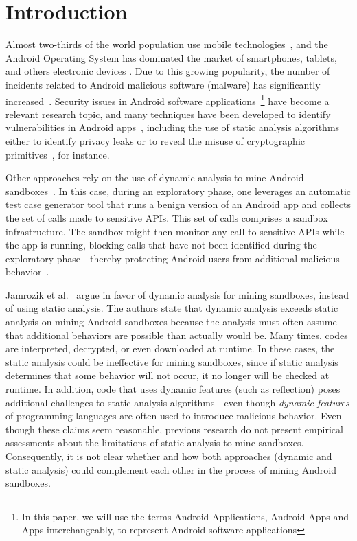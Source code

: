 \section{Introduction}\label{sec:introduction}

Almost two-thirds of the world population use mobile technologies~\cite{Comscore}, and the Android Operating System has dominated the market of smartphones, tablets, and others electronic devices \cite{statcounter}. Due to this growing popularity, the number of incidents related to Android malicious software (malware) has significantly increased~\cite{DBLP:journals/comsur/FarukiBLGGCR15,DBLP:journals/csur/SufatrioTCT15}. Security issues in Android software applications~\footnote{In this paper, we will use the terms Android Applications, Android Apps and Apps interchangeably, to represent Android software applications} have become a relevant research topic, and many techniques have been developed to identify vulnerabilities in Android apps~\cite{DBLP:conf/pldi/ArztRFBBKTOM14}, including the use of static analysis algorithms either to identify privacy leaks or to reveal the misuse of cryptographic primitives~\cite{krueger:ecoop-2018,rahaman:ccs-2019}, for instance.

Other approaches rely on the use of dynamic analysis to mine Android sandboxes~\cite{DBLP:conf/icse/JamrozikSZ16}. In this case, during an exploratory phase, one leverages an automatic test case generator tool that runs a benign version of an Android app and collects the set of calls made to sensitive APIs. This set of calls comprises a sandbox infrastructure. The sandbox might then monitor any call to sensitive APIs while the app is running, blocking calls that have not been identified during the exploratory phase---thereby protecting Android users from additional malicious behavior~\cite{DBLP:conf/icse/JamrozikSZ16}.

Jamrozik et al.~\cite{DBLP:conf/icse/JamrozikSZ16} argue in favor of dynamic analysis for mining sandboxes, instead of using static analysis.
The authors state that dynamic analysis exceeds static analysis on mining Android sandboxes because the analysis must often
assume that additional behaviors are possible than actually would be. Many times, codes are interpreted, decrypted, or even downloaded at runtime. In these cases, the static analysis could be ineffective for mining sandboxes, since if static analysis determines that some behavior will not occur, it no longer will be checked at runtime. In addition, code that uses dynamic features (such as reflection) poses additional challenges to static analysis algorithms---even though \emph{dynamic features} of programming languages are often used to introduce malicious behavior. Even though these claims seem reasonable, previous research do not present empirical assessments about the limitations of static analysis to mine sandboxes. Consequently, it is not clear whether and how both approaches (dynamic and static analysis) could complement each other in the process of mining Android sandboxes.

